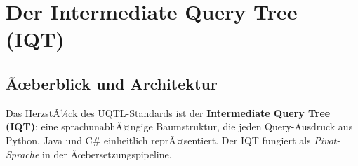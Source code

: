 ﻿%
\section{Der Intermediate Query Tree (IQT)}
\label{sec:iqt}

\subsection{Ãœberblick und Architektur}
\label{subsec:iqt_uebersicht}

Das HerzstÃ¼ck des UQTL-Standards ist der \textbf{Intermediate Query Tree
(IQT)}: eine sprachunabhÃ¤ngige Baumstruktur, die jeden Query-Ausdruck aus
Python, Java und C\# einheitlich reprÃ¤sentiert. Der IQT fungiert als
\emph{Pivot-Sprache} in der Ãœbersetzungspipeline.

